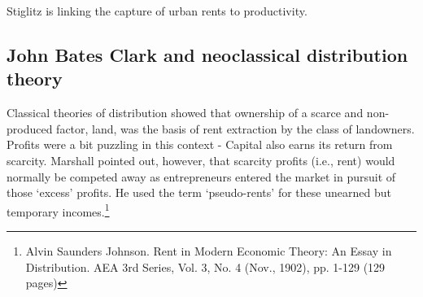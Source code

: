 



Stiglitz %
is linking the capture of urban rents to productivity.

  \subsection{John Bates Clark and neoclassical distribution theory}
  
  Classical theories of distribution showed that ownership of a scarce and non-produced factor, land, was the  basis of rent extraction by the class of landowners. Profits were a bit puzzling in this context - Capital also earns its return from scarcity. %
  Marshall %
   pointed out, however, that scarcity profits (i.e., rent) would normally be competed away  as entrepreneurs entered the market in pursuit of those `excess' profits. He used the term `pseudo-rents' for these unearned but temporary incomes.\footnote{Alvin Saunders Johnson. Rent in Modern Economic Theory: An Essay in Distribution. AEA 3rd Series, Vol. 3, No. 4 (Nov., 1902), pp. 1-129 (129 pages)}

